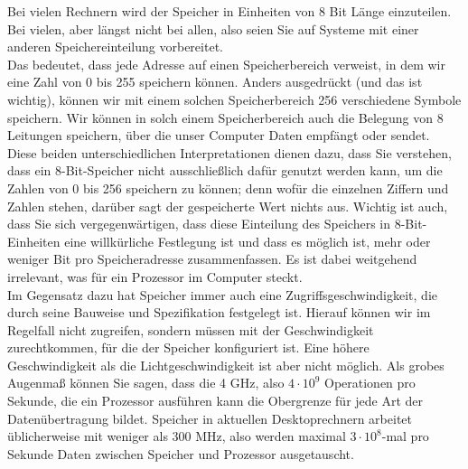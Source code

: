 Bei vielen Rechnern wird der Speicher in Einheiten von 8 Bit Länge einzuteilen. Bei vielen, aber längst nicht bei allen, also seien Sie auf Systeme mit einer anderen Speichereinteilung vorbereitet.\\

Das bedeutet, dass jede Adresse auf einen Speicherbereich verweist, in dem wir eine Zahl von 0 bis 255 speichern können. Anders ausgedrückt (und das ist wichtig), können wir mit einem solchen Speicherbereich 256 verschiedene Symbole \glqq{}speichern\grqq{}. Wir können in solch einem Speicherbereich auch die Belegung von 8 Leitungen  speichern, über die unser Computer Daten empfängt oder sendet.\\

Diese beiden unterschiedlichen Interpretationen dienen dazu, dass Sie verstehen, dass ein 8-Bit-Speicher nicht ausschließlich dafür genutzt werden kann, um die Zahlen von 0 bis 256 speichern zu können; denn wofür die einzelnen Ziffern und Zahlen stehen, darüber sagt der gespeicherte Wert nichts aus. Wichtig ist auch, dass Sie sich vergegenwärtigen, dass diese Einteilung des Speichers in 8-Bit-Einheiten eine willkürliche Festlegung ist und dass es möglich ist, mehr oder weniger Bit pro Speicheradresse zusammenfassen. Es ist dabei weitgehend irrelevant, was für ein Prozessor im Computer steckt.\\

Im Gegensatz dazu hat Speicher immer auch eine Zugriffsgeschwindigkeit, die durch seine Bauweise und Spezifikation festgelegt ist. Hierauf können wir im Regelfall nicht zugreifen, sondern müssen mit der Geschwindigkeit zurechtkommen, für die der Speicher konfiguriert ist. Eine höhere Geschwindigkeit als die Lichtgeschwindigkeit ist aber nicht möglich. Als grobes Augenmaß können Sie sagen, dass die 4 GHz, also \(4 \cdot 10^9\) Operationen pro Sekunde, die ein Prozessor ausführen kann die Obergrenze für jede Art der Datenübertragung bildet. Speicher in aktuellen Desktoprechnern arbeitet üblicherweise mit weniger als 300 MHz, also werden maximal \(3 \cdot 10^8\)-mal pro Sekunde Daten zwischen Speicher und Prozessor ausgetauscht.\\

